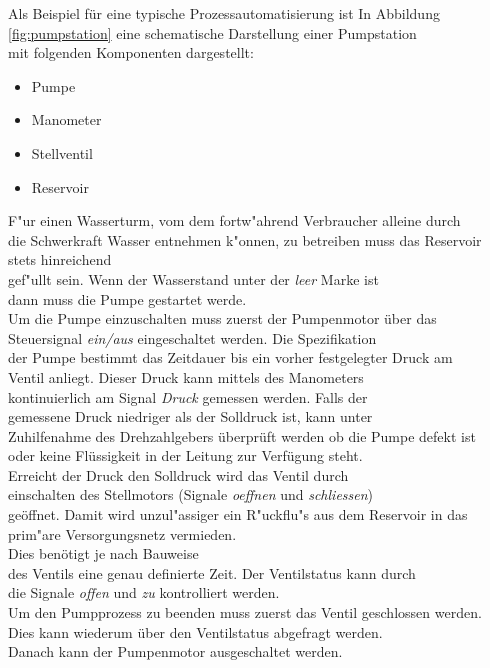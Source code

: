 \documentclass[11pt]{article}
\begin{document}
Als Beispiel für eine typische Prozessautomatisierung ist In Abbildung\\
\ref{fig:pumpstation} eine schematische Darstellung einer Pumpstation\\
mit folgenden Komponenten dargestellt:\\

\begin{itemize}
    \item Pumpe
    \item Manometer
    \item Stellventil
    \item Reservoir
\end{itemize}

F"ur einen Wasserturm, vom dem fortw"ahrend Verbraucher alleine durch\\
die Schwerkraft Wasser entnehmen k"onnen, zu betreiben muss das Reservoir\\
stets hinreichend\\
gef"ullt sein. Wenn der Wasserstand unter der \textit{leer} Marke ist\\
dann muss die Pumpe gestartet werde.\\
Um die Pumpe einzuschalten muss zuerst der Pumpenmotor über das\\
Steuersignal \textit{ein/aus} eingeschaltet werden.  Die Spezifikation\\
der Pumpe bestimmt das Zeitdauer bis ein vorher festgelegter Druck am\\
Ventil anliegt.  Dieser Druck kann mittels des Manometers\\
kontinuierlich am Signal \textit{Druck} gemessen werden.  Falls der\\
gemessene Druck niedriger als der Solldruck ist, kann unter\\
Zuhilfenahme des Drehzahlgebers überprüft werden ob  die Pumpe defekt ist\\
oder keine Flüssigkeit in der Leitung zur Verfügung steht.\\
Erreicht der Druck den Solldruck wird das Ventil durch\\
einschalten des Stellmotors (Signale \textit{oeffnen} und \textit{schliessen})\\
geöffnet. Damit wird unzul"assiger ein R"uckflu"s aus dem Reservoir in das\\
prim"are  Versorgungsnetz vermieden.\\
Dies benötigt je nach Bauweise\\
des Ventils eine genau definierte Zeit.  Der Ventilstatus kann durch\\
die Signale \textit{offen} und \textit{zu} kontrolliert werden.\\
Um den Pumpprozess zu beenden muss zuerst das Ventil geschlossen werden.\\
Dies kann wiederum über den Ventilstatus abgefragt werden.\\
Danach kann der Pumpenmotor ausgeschaltet werden.\\
\end{document}
